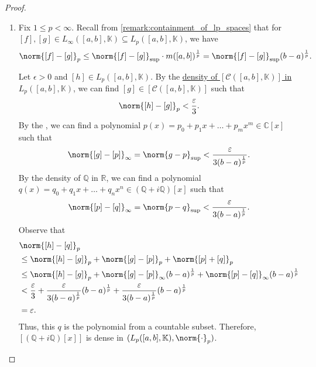 \documentclass[notoc,notitlepage]{tufte-book}
\begin{document}
\begin{proof}
  \begin{enumerate}
    \item Fix $1 \leq p < \infty$.
      Recall from \cref{remark:containment_of_lp_spaces} that for
      $[f], [g] \in L_{\infty}([a, b], \mathbb{K}) \subseteq L_p([a, b], \mathbb{K})$,
      we have
      \begin{equation*}
        \norm{[f] - [g]}_p
        \leq \norm{[f] - [g]}_{\sup} \cdot m([a, b])^{\frac{1}{p}}
        = \norm{[f] - [g]}_{\sup} (b - a)^{\frac{1}{p}}.
      \end{equation*}

      Let $\epsilon > 0$ and $[h] \in L_p([a, b], \mathbb{K})$.
      By the
      \hyperref[thm:density_of_equivalence_classes_of_continuous_functions_in_l_p_spaces]{density
        of $[\mathcal{C}([a, b], \mathbb{K})]$ in $L_p([a, b], \mathbb{K})$},
      we can find $[g] \in [\mathcal{C}([a, b], \mathbb{K})]$ such that
      \begin{equation*}
        \norm{[h] - [g]}_p < \frac{\epsilon}{3}.
      \end{equation*}
      By the ,
      we can find a polynomial
      $p(x) = p_0 + p_1 x + \hdots + p_m x^m \in \mathbb{C}[x]$
      such that
      \begin{equation*}
        \norm{[g] - [p]}_\infty = \norm{g - p}_{\sup}
        < \frac{\epsilon}{3(b - a)^{\frac{1}{p}}}.
      \end{equation*}
      By the density of $\mathbb{Q}$ in $\mathbb{R}$, we can find a polynomial
      $q(x) = q_0 + q_1 x + \hdots + q_n x^n \in (\mathbb{Q} + i \mathbb{Q})[x]$
      such that
      \begin{equation*}
        \norm{[p] - [q]}_\infty = \norm{p - q}_{\sup}
        < \frac{\epsilon}{3 (b - a)^{\frac{1}{p}}}.
      \end{equation*}
      Observe that
      \begin{align*}
        &\norm{[h] - [q]}_p \\
        &\leq \norm{[h] - [g]}_p + \norm{[g] - [p]}_p + \norm{[p] + [q]}_p \\
        &\leq \norm{[h] - [g]}_p + \norm{[g] - [p]}_\infty (b - a)^{\frac{1}{p}}
          + \norm{[p] - [q]}_{\infty} (b - a)^{\frac{1}{p}} \\
        &< \frac{\epsilon}{3}
          + \frac{\epsilon}{3(b-a)^{\frac{1}{p}}} (b-a)^{\frac{1}{p}}
          + \frac{\epsilon}{3(b-a)^{\frac{1}{p}}} (b-a)^{\frac{1}{p}} \\
        &= \epsilon.
      \end{align*}
      Thus, this $q$ is the polynomial from a countable subset.
      Therefore, $[(\mathbb{Q} + i \mathbb{Q})[x]]$ is dense in
      $(L_p([a, b], \mathbb{K}), \norm{\cdot}_p)$.


\end{enumerate}
\end{proof}
\end{document}
